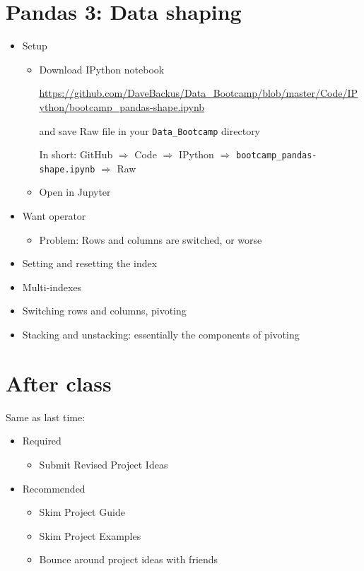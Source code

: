 \documentclass[11pt]{article}
\begin{document}
\section*{Pandas 3:  Data shaping}

\begin{itemize}
\item Setup
\begin{itemize}
\item Download IPython notebook

\url{https://github.com/DaveBackus/Data_Bootcamp/blob/master/Code/IPython/bootcamp_pandas-shape.ipynb}

and save Raw file in your \verb|Data_Bootcamp| directory

In short:  GitHub $\Rightarrow$ Code $\Rightarrow$ IPython $\Rightarrow$
 \verb|bootcamp_pandas-shape.ipynb| $\Rightarrow$ Raw

\item Open in Jupyter
\end{itemize}

\item Want operator 
\begin{itemize}
\item Problem:  Rows and columns are switched, or worse 
\end{itemize}

\item Setting and resetting the index
\item Multi-indexes 
\item Switching rows and columns, pivoting 
\item Stacking and unstacking:  essentially the components of pivoting 
\end{itemize}

\section*{After class}


Same as last time:  
\begin{itemize}
\item Required
\begin{itemize}
\item Submit Revised Project Ideas
\end{itemize}
\item Recommended
\begin{itemize}
\item Skim Project Guide
\item Skim Project Examples
\item Bounce around project ideas with friends
\end{itemize}
\end{itemize}



\end{document}
